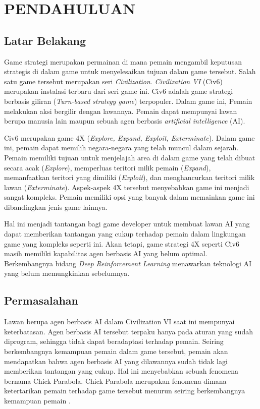 \chapter{PENDAHULUAN}
\label{chap:pendahuluan}


\section{Latar Belakang}
\label{sec:latarbelakang}

Game strategi merupakan permainan di mana pemain mengambil keputusan strategis di dalam game untuk menyelesaikan tujuan dalam game tersebut. Salah satu game tersebut merupakan seri \emph{Civilization}. 
\emph{Civilization VI} (Civ6) merupakan instalasi terbaru dari seri game ini. Civ6 adalah game strategi berbasis giliran (\emph{Turn-based strategy game}) terpopuler. 
Dalam game ini, Pemain melakukan aksi bergilir dengan lawannya. Pemain dapat mempunyai lawan berupa manusia lain maupun sebuah agen berbasis \emph{artificial intelligence} (AI).

Civ6 merupakan game 4X (\emph{Explore, Expand, Exploit, Exterminate}). Dalam game ini, pemain dapat memilih negara-negara yang telah muncul dalam sejarah. 
Pemain memiliki tujuan untuk menjelajah area di dalam game yang telah dibuat secara acak (\emph{Explore}), memperluas teritori milik pemain (\emph{Expand}), memanfaatkan teritori yang dimiliki (\emph{Exploit}), dan menghancurkan teritori milik lawan (\emph{Exterminate}). 
Aspek-aspek 4X tersebut menyebabkan game ini menjadi sangat kompleks. Pemain memiliki opsi yang banyak dalam memainkan game ini dibandingkan jenis game lainnya.

Hal ini menjadi tantangan bagi game developer untuk membuat lawan AI yang dapat memberikan tantangan yang cukup terhadap pemain dalam lingkungan game yang kompleks seperti ini. 
Akan tetapi, game strategi 4X seperti Civ6 masih memiliki kapabilitas agen berbasis AI yang belum optimal. 
Berkembangnya bidang \emph{Deep Reinforcement Learning} menawarkan teknologi AI yang belum memungkinkan sebelumnya. 

\section{Permasalahan}
\label{sec:permasalahan}

Lawan berupa agen berbasis AI dalam Civilization VI saat ini mempunyai keterbatasan. Agen berbasis AI tersebut terpaku hanya pada aturan yang sudah diprogram, sehingga tidak dapat beradaptasi terhadap pemain. Seiring berkembangnya kemampuan pemain dalam game tersebut, pemain akan mendapatkan bahwa agen berbasis AI yang dilawannya sudah tidak lagi memberikan tantangan yang cukup. Hal ini menyebabkan sebuah fenomena bernama Chick Parabola. Chick Parabola merupakan fenomena dimana ketertarikan pemain terhadap game tersebut menurun seiring berkembangnya kemampuan pemain \citep{chickParabola}.

